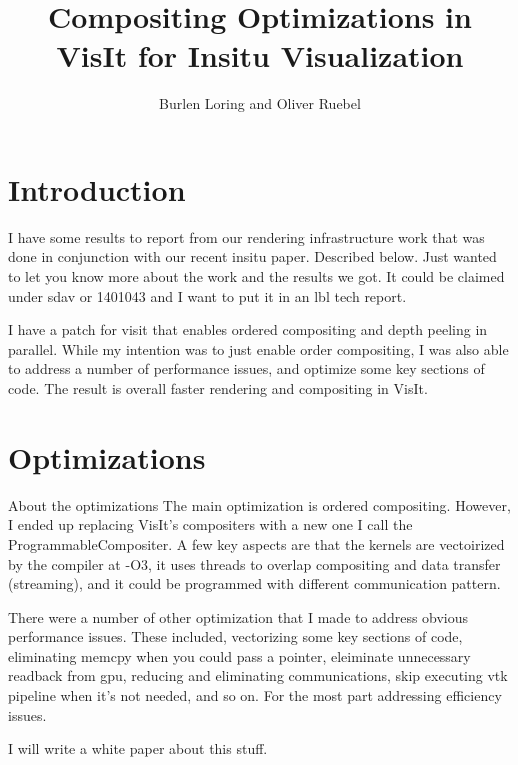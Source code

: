 \documentclass[a4paper,10pt]{report}
\title{Compositing Optimizations in VisIt for Insitu Visualization}
\author{Burlen Loring and Oliver Ruebel}
\begin{document}
\maketitle

\begin{abstract}
\end{abstract}

\section{Introduction}



I have some results to report from our rendering infrastructure work that was done in conjunction with our recent insitu paper. Described below. Just wanted to let you know more about the work and the results we got. It could be claimed under sdav or 1401043 and I want to put it in an lbl tech report.

I have a patch for visit that enables ordered compositing and depth peeling in parallel. While my intention was to just enable order compositing, I was also able to address a number of performance issues, and optimize some key sections of code. The result is overall faster rendering and compositing in VisIt.





\section{Optimizations}
About the optimizations
The main optimization is ordered compositing. However, I ended up replacing VisIt's compositers with a new one I call the ProgrammableCompositer. A few key aspects are that the kernels are vectoirized by the compiler at -O3, it uses threads to overlap compositing and data transfer (streaming), and it could be programmed with different communication pattern.

There were a number of other optimization that I made to address obvious performance issues. These included, vectorizing some key sections of code, eliminating memcpy when you could pass a pointer, eleiminate unnecessary readback from gpu, reducing and eliminating communications, skip executing vtk pipeline when it's not needed, and so on. For the most part addressing efficiency issues.

I will write a white paper about this stuff.
\end{document}

